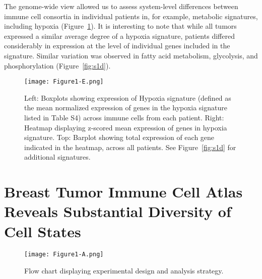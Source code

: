 
The genome-wide view allowed us to assess system-level differences between immune cell consortia in individual patients in, for example, metabolic signatures, including hypoxia (Figure~\ref{fig:1e}).
It is interesting to note that while all tumors expressed a similar average degree of a hypoxia signature, patients differed considerably in expression at the level of individual genes included in the signature.
Similar variation was observed in fatty acid metabolism, glycolysis, and phosphorylation (Figure~\ref{fig:s1d}).

\begin{figure}
\centering
\texttt{[image: Figure1-E.png]}
\caption{Left: Boxplots showing expression of Hypoxia signature (defined as the mean normalized expression of genes in the hypoxia signature listed in Table S4) across immune cells from each patient.
  Right: Heatmap displaying z-scored mean expression of genes in hypoxia signature.
  Top: Barplot showing total expression of each gene indicated in the heatmap, across all patients.
  See Figure~\ref{fig:s1d} for additional signatures.
}
\label{fig:1e}
\end{figure}

\section{Breast Tumor Immune Cell Atlas Reveals Substantial Diversity of Cell States}

\begin{figure}
\centering
\texttt{[image: Figure1-A.png]}
\caption{Flow chart displaying experimental design and analysis strategy.}
\label{fig:1a}
\end{figure} %

